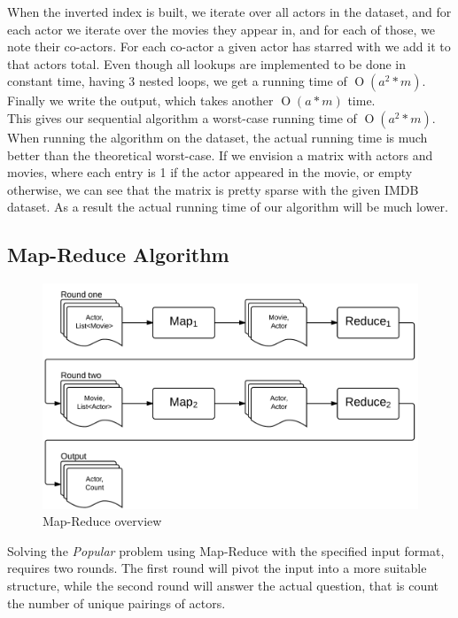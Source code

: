 \documentclass[a4paper,11pt]{article}
\newcommand{\BigO}[1]{\ensuremath{\operatorname{O}\left(#1\right)}}
\begin{document}
When the inverted index is built, we iterate over all actors in the dataset, and for each actor we iterate over the movies they appear in, and for each of those, we note their co-actors. For each co-actor a given actor has starred with we add it to that actors total. Even though all lookups are implemented to be done in constant time, having 3 nested loops, we get a running time of \BigO{a^2*m}. Finally we write the output, which takes another \BigO{a*m} time.\\

This gives our sequential algorithm a worst-case running time of \BigO{a^2*m}. When running the algorithm on the dataset, the actual running time is much better than the theoretical worst-case. If we envision a matrix with actors and movies, where each entry is 1 if the actor appeared in the movie, or empty otherwise, we can see that the matrix is pretty sparse with the given IMDB dataset. As a result the actual running time of our algorithm will be much lower.

\subsection{Map-Reduce Algorithm}
\label{sub:map-reduce}
\begin{figure}
\centering \includegraphics[scale=0.2]{map-reduce-figure.png}
\vspace{-10pt}
\caption{Map-Reduce overview}
\label{fig:map-reduce}
\vspace{-10pt}
\end{figure}

Solving the \emph{Popular} problem using Map-Reduce with the specified input format, requires two rounds. The first round will pivot the input into a more suitable structure, while the second round will answer the actual question, that is count the number of unique pairings of actors.
\end{document}
